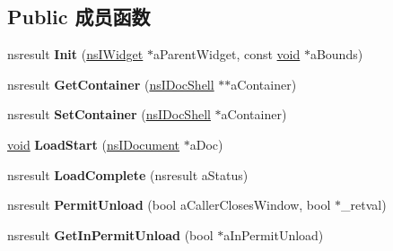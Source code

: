 \subsection*{Public 成员函数}
\begin{DoxyCompactItemize}
\item 
\mbox{\label{interfacens_i_content_viewer_adf30c32ad5bb206aee78d44e9a549cbc}} 
nsresult {\bfseries Init} (\hyperlink{interfacens_i_supports}{ns\+I\+Widget} $\ast$a\+Parent\+Widget, const \hyperlink{interfacevoid}{void} $\ast$a\+Bounds)
\item 
\mbox{\label{interfacens_i_content_viewer_aa1da9f24cf73fec744f598b153fb0a95}} 
nsresult {\bfseries Get\+Container} (\hyperlink{interfacens_i_doc_shell}{ns\+I\+Doc\+Shell} $\ast$$\ast$a\+Container)
\item 
\mbox{\label{interfacens_i_content_viewer_a6b005423d56bdda7eb3b1c8421205042}} 
nsresult {\bfseries Set\+Container} (\hyperlink{interfacens_i_doc_shell}{ns\+I\+Doc\+Shell} $\ast$a\+Container)
\item 
\mbox{\label{interfacens_i_content_viewer_a8ea89ba9da2f87b4e70ed3d65887c462}} 
\hyperlink{interfacevoid}{void} {\bfseries Load\+Start} (\hyperlink{interfacens_i_document}{ns\+I\+Document} $\ast$a\+Doc)
\item 
\mbox{\label{interfacens_i_content_viewer_ab4b0ea48ad5b98e0bf9539a4502860ea}} 
nsresult {\bfseries Load\+Complete} (nsresult a\+Status)
\item 
\mbox{\label{interfacens_i_content_viewer_adc1fa721dfc5ce4fcde5ec7294996439}} 
nsresult {\bfseries Permit\+Unload} (bool a\+Caller\+Closes\+Window, bool $\ast$\+\_\+retval)
\item 
\mbox{\label{interfacens_i_content_viewer_ab08710af226d49fc7bc35e9a3aee5df2}} 
nsresult {\bfseries Get\+In\+Permit\+Unload} (bool $\ast$a\+In\+Permit\+Unload)
\item 
\mbox{\label{interfacens_i_content_viewer_ab52b10313cd029da3d046270fddb3e02}} 
$$
\end{DoxyCompactItemize}
